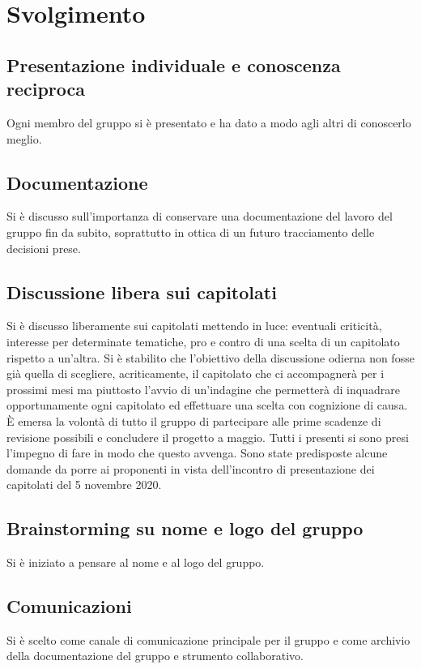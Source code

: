 \newpage

\section*{Svolgimento}
\subsection*{Presentazione individuale e conoscenza reciproca}
Ogni membro del gruppo si è presentato e ha dato a modo agli altri di conoscerlo meglio.

\subsection*{Documentazione}
Si è discusso sull'importanza di conservare una documentazione del lavoro del gruppo fin da subito, soprattutto in ottica di un futuro tracciamento delle decisioni prese.

\subsection*{Discussione libera sui capitolati}
Si è discusso liberamente sui capitolati mettendo in luce: eventuali criticità, interesse per determinate tematiche, pro e contro di una scelta di un capitolato rispetto a un'altra. Si è stabilito che l'obiettivo della discussione odierna non fosse già quella di scegliere, acriticamente, il capitolato che ci accompagnerà per i prossimi mesi  ma piuttosto l'avvio di un'indagine che permetterà di inquadrare opportunamente ogni capitolato ed effettuare una scelta con cognizione di causa. 
È emersa la volontà di tutto il gruppo di partecipare alle prime scadenze di revisione possibili e concludere il progetto a maggio. Tutti i presenti si sono presi l'impegno di fare in modo che questo avvenga. Sono state predisposte alcune domande da porre ai proponenti in vista dell'incontro di presentazione dei capitolati del 5 novembre 2020.

\subsection*{Brainstorming su nome e logo del gruppo}
Si è iniziato a pensare al nome e al logo del gruppo.

\subsection*{Comunicazioni}
Si è scelto  come canale di comunicazione principale per il gruppo e  come archivio della documentazione del gruppo e strumento collaborativo.